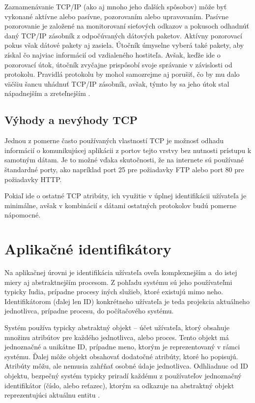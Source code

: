 \documentclass[
  digital, %
  oneside, %
  table,   %
  lof,     %
  nolot,   %
  nocover
]{fithesis3}
\begin{document}
Zaznamenávanie TCP/IP (ako aj mnoho jeho ďalších spôsobov) môže byť vykonané
aktívne alebo pasívne, pozorovaním alebo upravovaním. Pasívne pozorovanie je
založené na monitorovaní sieťových odkazov a pokusoch odhadnúť daný TCP/IP
zásobník z odpočúvaných dátových paketov. Aktívny pozorovací pokus však dátové
pakety aj zasiela. Útočník úmyselne vyberá také pakety, aby získal čo najviac
informácií od vzdialeného hostiteľa. Avšak, keďže ide o pozorovací útok,
útočník zvyčajne prispôsobí svoje správanie v závislosti od protokolu. Pravidlá
protokolu by mohol samozrejme aj porušiť, čo by mu dalo väčšiu šancu uhádnuť
TCP/IP zásobník, avšak, týmto by sa jeho útok stal nápadnejším a zreteľnejším \cite{FIDIS:TCP}.
 
\subsection{Výhody a nevýhody TCP}
Jednou z pomerne často používaných vlastností TCP je možnosť odhadu informácií
o komunikujúcej aplikácii z portov tejto vrstvy bez nutnosti prístupu k samotným
dátam. Je to možné vďaka skutočnosti, že na internete sú používané štandardné
porty, ako napríklad port 25 pre požiadavky FTP alebo port 80 pre požiadavky HTTP.

Pokiaľ ide o ostatné TCP atribúty, ich využitie v úplnej identifikácii
užívateľa je minimálne, avšak v kombinácií s dátami ostatných protokolov budú
pomerne nápomocné.

\section{Aplikačné identifikátory}
Na aplikačnej úrovni je identifikácia užívateľa oveľa komplexnejším a~do istej
miery aj abstraktnejším procesom. Z pohľadu systému sú jeho používateľmi
typicky ľudia, prípadne procesy iných služieb, ktoré existujú mimo neho.
Identifikátorom (ďalej len ID) konkrétneho užívateľa je teda projekcia aktuálneho
jednotlivca, prípadne procesu, do počítačového systému.

Systém používa typicky
abstraktný objekt -- účet užívateľa, ktorý obsahuje množinu atribútov pre
každého jednotlivca, alebo proces. Tento objekt má jednoznačné a unikátne
ID, prípadne meno, ktorým je reprezentovaný v rámci systému. Ďalej môže objekt
obsahovať dodatočné atribúty, ktoré ho popisujú. Atribúty môžu, ale nemusia
zahŕňať osobné údaje jednotlivca. Odhliadnuc od ID objektu, bezpečný systém
typicky priradí každému z používateľov jednoznačný identifikátor (číslo, alebo
reťazec), ktorým sa odkazuje na abstraktný objekt reprezentujúci aktuálnu
entitu \cite{Todorov:2007:EX}. 
\end{document}
